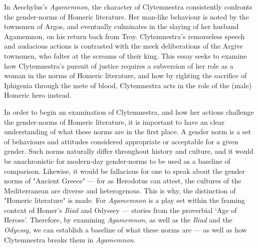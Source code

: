 In Aeschylus's \textit{Agamemnon}, the character of Clytemnestra consistently
confronts the gender-norms of Homeric literature. Her man-like behaviour is
noted by the townsmen of Argos, and eventually culminates in the slaying of
her husband Agamemnon, on his return back from Troy. Clytemnestra's
remorseless speech and audacious actions is contrasted with the meek
deliberations of the Argive townsmen, who falter at the screams of their king.
This essay seeks to examine how Clytemnestra's pursuit of justice requires a
subversion of her role as a woman in the norms of Homeric literature, and how
by righting the sacrifice of Iphigenia through the mete of blood, Clytemnestra
acts in the role of the (male) Homeric hero instead.

In order to begin an examination of Clytemnestra, and how her actions challenge
the gender-norms of Homeric literature, it is important to have an clear
understanding of what these norms are in the first place. A gender norm is a
set of behaviours and attitudes considered appropriate or acceptable for a given
gender. Such norms naturally differ throughout history and culture, and it
would be anachronistic for modern-day gender-norms to be used as a baseline
of comparison. Likewise, it would be fallacious for one to speak about the
gender norms of "Ancient Greece" --- for as Herodotus can attest, the cultures
of the Mediterranean are diverse and heterogenous. This is why, the distinction
of "Homeric literature" is made. For \textit{Agamemnon} is a play set within the
framing context of Homer's \textit{Iliad} and {Odyssey} --- stories from the
proverbial `Age of Heroes'. Therefore, by examining \textit{Agamemnon}, as well
as the \textit{Iliad} and the \textit{Odyessy}, we can establish a baseline of
what these norms are --- as well as how Clytemnestra breaks them in
\textit{Agamemnon}.
